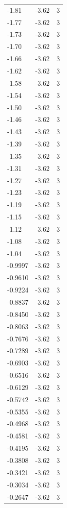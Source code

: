 \begin{longtable}{lrr}
  -1.81 & -3.62 & 3 \\
  -1.77 & -3.62 & 3 \\
  -1.73 & -3.62 & 3 \\
  -1.70 & -3.62 & 3 \\
  -1.66 & -3.62 & 3 \\
  -1.62 & -3.62 & 3 \\
  -1.58 & -3.62 & 3 \\
  -1.54 & -3.62 & 3 \\
  -1.50 & -3.62 & 3 \\
  -1.46 & -3.62 & 3 \\
  -1.43 & -3.62 & 3 \\
  -1.39 & -3.62 & 3 \\
  -1.35 & -3.62 & 3 \\
  -1.31 & -3.62 & 3 \\
  -1.27 & -3.62 & 3 \\
  -1.23 & -3.62 & 3 \\
  -1.19 & -3.62 & 3 \\
  -1.15 & -3.62 & 3 \\
  -1.12 & -3.62 & 3 \\
  -1.08 & -3.62 & 3 \\
  -1.04 & -3.62 & 3 \\
  -0.9997 & -3.62 & 3 \\
  -0.9610 & -3.62 & 3 \\
  -0.9224 & -3.62 & 3 \\
  -0.8837 & -3.62 & 3 \\
  -0.8450 & -3.62 & 3 \\
  -0.8063 & -3.62 & 3 \\
  -0.7676 & -3.62 & 3 \\
  -0.7289 & -3.62 & 3 \\
  -0.6903 & -3.62 & 3 \\
  -0.6516 & -3.62 & 3 \\
  -0.6129 & -3.62 & 3 \\
  -0.5742 & -3.62 & 3 \\
  -0.5355 & -3.62 & 3 \\
  -0.4968 & -3.62 & 3 \\
  -0.4581 & -3.62 & 3 \\
  -0.4195 & -3.62 & 3 \\
  -0.3808 & -3.62 & 3 \\
  -0.3421 & -3.62 & 3 \\
  -0.3034 & -3.62 & 3 \\
  -0.2647 & -3.62 & 3 \\

\end{longtable}
